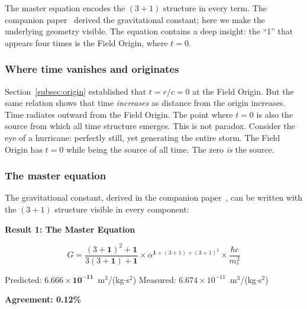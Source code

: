 \documentclass[aps,prd,preprint,superscriptaddress,showpacs,preprintnumbers,amsmath,amssymb,nofootinbib]{revtex4-2}
\begin{document}
The master equation encodes the $(3+1)$ structure in every term. The companion paper~\cite{paper6} derived the gravitational constant; here we make the underlying geometry visible. The equation contains a deep insight: the ``1'' that appears four times is the Field Origin, where $t = 0$.

\subsubsection*{Where time vanishes and originates}

Section~\ref{subsec:origin} established that $t = r/c = 0$ at the Field Origin. But the same relation shows that time \emph{increases} as distance from the origin increases. Time radiates outward from the Field Origin. The point where $t = 0$ is also the source from which all time structure emerges. This is not paradox. Consider the eye of a hurricane: perfectly still, yet generating the entire storm. The Field Origin has $t = 0$ while being the source of all time. The zero \emph{is} the source.

\subsubsection*{The master equation}

The gravitational constant, derived in the companion paper~\cite{paper6}, can be written with the $(3+1)$ structure visible in every component:

\vspace{1.5em}
\noindent
\colorbox{resultgreen}{\parbox{\dimexpr\textwidth-2\fboxsep\relax}{%
\vspace{0.8em}
\centering
\textbf{\large Result 1: The Master Equation}

\vspace{0.5em}
\boldmath
\begin{equation}
G = \frac{(3+\mathbf{1})^2 + \mathbf{1}}{3(3+\mathbf{1}) + \mathbf{1}} \times \alpha^{\mathbf{1}+(3+1)+(3+1)^2} \times \frac{\hbar c}{m_e^2}
\label{eq:master}
\end{equation}
\unboldmath

\vspace{0.3em}
Predicted: $\bm{6.666 \times 10^{-11}}$~m$^3$/(kg$\cdot$s$^2$) \quad Measured: $6.674 \times 10^{-11}$~m$^3$/(kg$\cdot$s$^2$)

\textbf{Agreement: 0.12\%}
\vspace{0.5em}
}}
\vspace{1cm}
\end{document}
